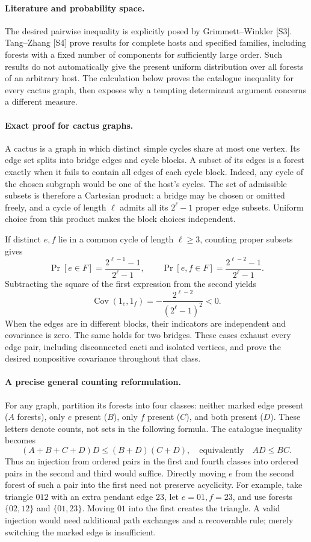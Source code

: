 \documentclass[11pt,a4paper]{article}
\begin{document}
\paragraph{Literature and probability space.}
The desired pairwise inequality is explicitly posed by Grimmett--Winkler [S3]. Tang--Zhang [S4] prove results for complete hosts and specified families, including forests with a fixed number of components for sufficiently large order. Such results do not automatically give the present uniform distribution over all forests of an arbitrary host. The calculation below proves the catalogue inequality for every cactus graph, then exposes why a tempting determinant argument concerns a different measure.

\paragraph{Exact proof for cactus graphs.}
A cactus is a graph in which distinct simple cycles share at most one vertex. Its edge set splits into bridge edges and cycle blocks. A subset of its edges is a forest exactly when it fails to contain all edges of each cycle block. Indeed, any cycle of the chosen subgraph would be one of the host's cycles. The set of admissible subsets is therefore a Cartesian product: a bridge may be chosen or omitted freely, and a cycle of length $\ell$ admits all its $2^\ell-1$ proper edge subsets. Uniform choice from this product makes the block choices independent.

If distinct $e,f$ lie in a common cycle of length $\ell\ge3$, counting proper subsets gives
\[
 \Pr[e\in F]=\frac{2^{\ell-1}-1}{2^\ell-1},\qquad
 \Pr[e,f\in F]=\frac{2^{\ell-2}-1}{2^\ell-1}.
\]
Subtracting the square of the first expression from the second yields
\[
 \operatorname{Cov}(1_e,1_f)
 =-\frac{2^{\ell-2}}{(2^\ell-1)^2}<0.
\]
When the edges are in different blocks, their indicators are independent and covariance is zero. The same holds for two bridges. These cases exhaust every edge pair, including disconnected cacti and isolated vertices, and prove the desired nonpositive covariance throughout that class.

\paragraph{A precise general counting reformulation.}
For any graph, partition its forests into four classes: neither marked edge present ($A$ forests), only $e$ present ($B$), only $f$ present ($C$), and both present ($D$). These letters denote counts, not sets in the following formula. The catalogue inequality becomes
\[
 (A+B+C+D)D\le(B+D)(C+D),
 \quad\text{equivalently}\quad AD\le BC.
\]
Thus an injection from ordered pairs in the first and fourth classes into ordered pairs in the second and third would suffice. Directly moving $e$ from the second forest of such a pair into the first need not preserve acyclicity. For example, take triangle $012$ with an extra pendant edge $23$, let $e=01,f=23$, and use forests $\{02,12\}$ and $\{01,23\}$. Moving $01$ into the first creates the triangle. A valid injection would need additional path exchanges and a recoverable rule; merely switching the marked edge is insufficient.
\end{document}
